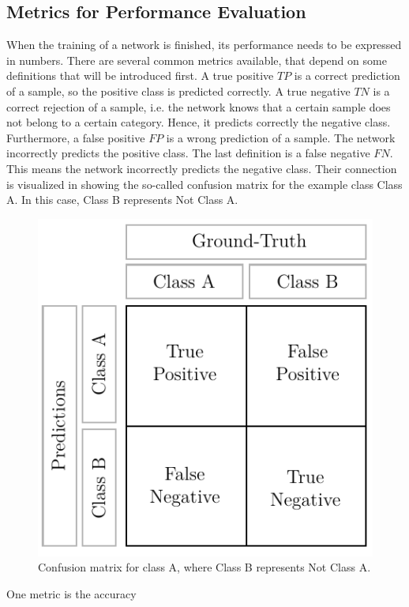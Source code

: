 \subsection{Metrics for Performance Evaluation}
\label{sec:neural-networks-metrics}
When the training of a network is finished, its performance needs to be expressed in numbers.
There are several common metrics available, that depend on some definitions that will be introduced first.
A true positive $TP$ is a correct prediction of a sample, so the positive class is predicted correctly.
A true negative $TN$ is a correct rejection of a sample, i.e. the network knows that a certain sample does not belong to a certain category.
Hence, it predicts correctly the negative class.
Furthermore, a false positive $FP$ is a wrong prediction of a sample.
The network incorrectly predicts the positive class.
The last definition is a false negative $FN$.
This means the network incorrectly predicts the negative class.
Their connection is visualized in  showing the so-called confusion matrix \cite{Fawcett:2006:IRA:1159473.1159475} for the example class Class A.
In this case, Class B represents Not Class A.
\begin{figure}
	\centering
	\includegraphics[]{images/confusion_matrix.pdf}
	\caption[Confusion matrix]{Confusion matrix for class A, where Class B represents Not Class A.}
	\label{fig:confusion-matrix}
\end{figure}
One metric is the accuracy

